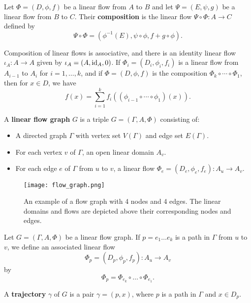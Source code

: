 \begin{definition}
\label{def:linear_flow_composition}
Let $\Phi = (D,\phi,f)$ be a linear flow from $A$ to $B$ and let $\Psi = (E,\psi,g)$ be a linear flow from $B$ to $C$. Their {\bf composition} is the linear flow $\Psi \circ \Phi: A \to C$ defined by
\[
\Psi \circ \Phi = (\phi^{-1}(E),\psi \circ \phi, f + g \circ \phi).
\]
\end{definition}

\begin{remark} Composition of linear flows is associative, and there is an identity linear flow $\iota_A:A \to A$ given by $\iota_A = (A,\operatorname{id}_A,0)$. If $\Phi_i=(D_i,\phi_i,f_i)$ is a linear flow from $A_{i-1}$ to $A_i$ for $i=1,\ldots,k$, and if $\Phi=(D,\phi,f)$ is the composition $\Phi_k\circ\cdots\circ \Phi_1$, then for $x\in D$, we have
\begin{equation}
\label{eqn:actioncomposition}
f(x) = \sum_{i=1}^kf_i((\phi_{i-1}\circ\cdots\circ\phi_1)(x)).
\end{equation}
\end{remark}

\begin{definition}
\label{def:linear_flow_graph}
A {\bf linear flow graph} $G$ is a triple $G = (\Gamma,A,\Phi)$ consisting of:
\begin{itemize}
 \item A directed graph $\Gamma$ with vertex set $V(\Gamma)$ and edge set $E(\Gamma)$.
 \item For each vertex $v$ of $\Gamma$, an open linear domain $A_v$.
 \item For each edge $e$ of $\Gamma$ from $u$ to $v$, a linear flow $\Phi_e = (D_e,\phi_e,f_e):A_u \to A_v$.
\end{itemize}
\end{definition}

\begin{figure}[h!]
\label{fig:flow_graph}
\texttt{[image: flow\_graph.png]}
\caption{An example of a flow graph with 4 nodes and 4 edges. The linear domains and flows are depicted above their corresponding nodes and edges.}
\end{figure}

Let $G=(\Gamma,A,\Phi)$ be a linear flow graph. If $p = e_1\dots e_k$ is a path in $\Gamma$ from $u$ to $v$, we define an associated linear flow
\[
\Phi_p = (D_p,\phi_p,f_p) : A_u \longrightarrow A_v
\]
by
\[
\Phi_p = \Phi_{e_k} \circ \dots \circ \Phi_{e_1}.
\]

\begin{definition}
\label{def:flow_graph_trajectory}
A {\bf trajectory} $\gamma$ of $G$ is a pair $\gamma = (p,x)$, where $p$ is a path in $\Gamma$ and $x \in D_p$.
\end{definition}

